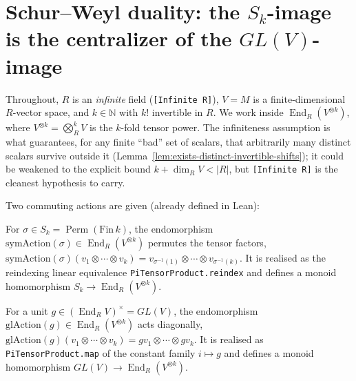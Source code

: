 


\section{Schur--Weyl duality: the $S_k$-image is the centralizer of the $GL(V)$-image}

Throughout, $R$ is an \emph{infinite} field (\texttt{[Infinite R]}), $V = M$ is a
finite-dimensional $R$-vector space, and $k \in \mathbb{N}$ with $k!$ invertible in $R$. We
work inside $\operatorname{End}_R(V^{\otimes k})$, where $V^{\otimes k} = \bigotimes^k_R V$ is
the $k$-fold tensor power. The infiniteness assumption is what guarantees, for any finite
``bad'' set of scalars, that arbitrarily many distinct scalars survive outside it
(Lemma~\ref{lem:exists-distinct-invertible-shifts}); it could be weakened to the explicit
bound $k + \dim_R V < |R|$, but \texttt{[Infinite R]} is the cleanest hypothesis to carry.

Two commuting actions are given (already defined in Lean):

\begin{definition}
    \label{def:symAction}
    \leanok
    For $\sigma \in S_k = \operatorname{Perm}(\mathrm{Fin}\,k)$, the endomorphism
    $\mathrm{symAction}(\sigma) \in \operatorname{End}_R(V^{\otimes k})$ permutes the tensor
    factors, $\mathrm{symAction}(\sigma)(v_1 \otimes \cdots \otimes v_k) =
    v_{\sigma^{-1}(1)} \otimes \cdots \otimes v_{\sigma^{-1}(k)}$. It is realised as the
    reindexing linear equivalence \texttt{PiTensorProduct.reindex} and defines a monoid
    homomorphism $S_k \to \operatorname{End}_R(V^{\otimes k})$.
\end{definition}

\begin{definition}
    \label{def:glAction}
    \leanok
    For a unit $g \in (\operatorname{End}_R V)^\times = GL(V)$, the endomorphism
    $\mathrm{glAction}(g) \in \operatorname{End}_R(V^{\otimes k})$ acts diagonally,
    $\mathrm{glAction}(g)(v_1 \otimes \cdots \otimes v_k) = g v_1 \otimes \cdots \otimes g v_k$.
    It is realised as \texttt{PiTensorProduct.map} of the constant family $i \mapsto g$ and
    defines a monoid homomorphism $GL(V) \to \operatorname{End}_R(V^{\otimes k})$.
\end{definition}

